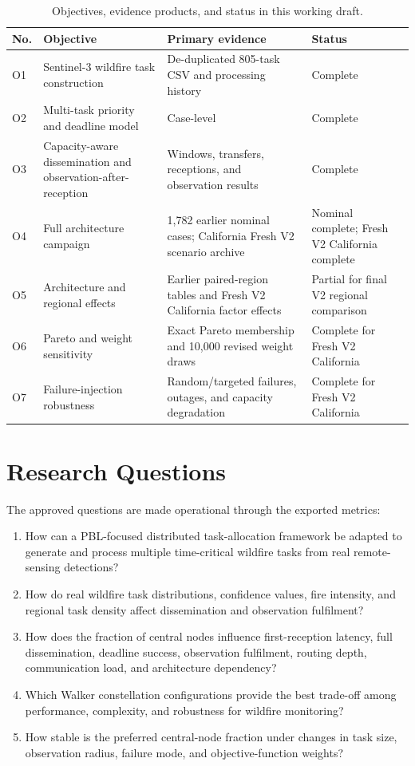 \begin{table}[htbp]
\centering
\small
\caption{Objectives, evidence products, and status in this working draft.}
\label{tab:objective_evidence}
\begin{tabularx}{\textwidth}{L{0.07\textwidth}Y L{0.28\textwidth} L{0.17\textwidth}}
\toprule
No. & Objective & Primary evidence & Status \\
\midrule
O1 & Sentinel-3 wildfire task construction & De-duplicated 805-task CSV and processing history & Complete \\
O2 & Multi-task priority and deadline model & Case-level  & Complete \\
O3 & Capacity-aware dissemination and observation-after-reception & Windows, transfers, receptions, and observation results & Complete \\
O4 & Full architecture campaign & 1,782 earlier nominal cases; California Fresh V2 scenario archive & Nominal complete; Fresh V2 California complete \\
O5 & Architecture and regional effects & Earlier paired-region tables and Fresh V2 California factor effects & Partial for final V2 regional comparison \\
O6 & Pareto and weight sensitivity & Exact Pareto membership and 10,000 revised weight draws & Complete for Fresh V2 California \\
O7 & Failure-injection robustness & Random/targeted failures, outages, and capacity degradation & Complete for Fresh V2 California \\
\bottomrule
\end{tabularx}
\end{table}

\section{Research Questions}

The approved questions are made operational through the exported metrics:

\begin{enumerate}[label=RQ\arabic*.,leftmargin=*]
\item How can a PBL-focused distributed task-allocation framework be adapted to generate and process multiple time-critical wildfire tasks from real remote-sensing detections?
\item How do real wildfire task distributions, confidence values, fire intensity, and regional task density affect dissemination and observation fulfilment?
\item How does the fraction of central nodes influence first-reception latency, full dissemination, deadline success, observation fulfilment, routing depth, communication load, and architecture dependency?
\item Which Walker constellation configurations provide the best trade-off among performance, complexity, and robustness for wildfire monitoring?
\item How stable is the preferred central-node fraction under changes in task size, observation radius, failure mode, and objective-function weights?
\end{enumerate}

